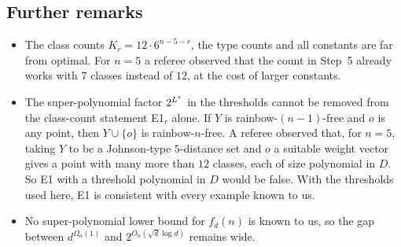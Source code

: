 \subsection{Further remarks}
\begin{itemize}[leftmargin=1.5em]
\item The class counts $K_r=12\cdot6^{n-5-r}$, the type counts and all constants are far from optimal. For $n=5$ a referee
  observed that the count in Step~5 already works with $7$ classes instead of $12$, at the cost of larger constants.
\item The super-polynomial factor $2^{L^{\ast}}$ in the thresholds cannot be removed from the class-count statement E1$_r$
  alone. If $Y$ is rainbow-$(n-1)$-free and $o$ is any point, then $Y\cup\{o\}$ is rainbow-$n$-free. A referee observed
  that, for $n=5$, taking $Y$ to be a Johnson-type $5$-distance set and $o$ a suitable weight vector gives a point
  with many more than $12$ classes, each of size polynomial in $D$. So E1 with a threshold polynomial in $D$ would be
  false. With the thresholds used here, E1 is consistent with every example known to us.
\item No super-polynomial lower bound for $f_d(n)$ is known to us, so the gap between $d^{\Omega_n(1)}$ and
  $2^{O_n(\sqrt d\log d)}$ remains wide.
\end{itemize}
